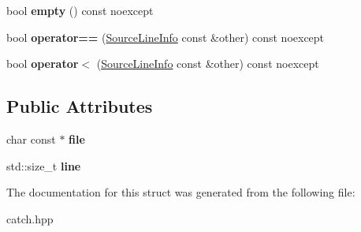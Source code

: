 \begin{DoxyCompactItemize}
bool {\bfseries empty} () const noexcept
\item 
\mbox{\label{struct_catch_1_1_source_line_info_af07e4fdeddf8409b91e4f842f6264cf8}} 
bool {\bfseries operator==} (\mbox{\hyperlink{struct_catch_1_1_source_line_info}{Source\+Line\+Info}} const \&other) const noexcept
\item 
\mbox{\label{struct_catch_1_1_source_line_info_af77415416919d2d6030b4be085b92f7a}} 
bool {\bfseries operator$<$} (\mbox{\hyperlink{struct_catch_1_1_source_line_info}{Source\+Line\+Info}} const \&other) const noexcept
\end{DoxyCompactItemize}
\subsection*{Public Attributes}
\begin{DoxyCompactItemize}
\item 
\mbox{\label{struct_catch_1_1_source_line_info_ad65537703e9f08c1fa7777fbc3f0c617}} 
char const  $\ast$ {\bfseries file}
\item 
\mbox{\label{struct_catch_1_1_source_line_info_a841e5d696c7b9cde24e45e61dd979c77}} 
std\+::size\+\_\+t {\bfseries line}
\end{DoxyCompactItemize}


The documentation for this struct was generated from the following file\+:\begin{DoxyCompactItemize}
\item 
catch.\+hpp\end{DoxyCompactItemize}
